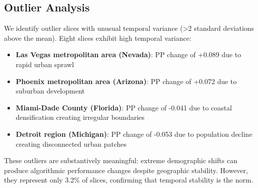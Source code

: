 \subsection{Outlier Analysis}

We identify outlier slices with unusual temporal variance (>2 standard deviations above the mean). Eight slices exhibit high temporal variance:
\begin{itemize}
    \item \textbf{Las Vegas metropolitan area (Nevada)}: PP change of +0.089 due to rapid urban sprawl
    \item \textbf{Phoenix metropolitan area (Arizona)}: PP change of +0.072 due to suburban development
    \item \textbf{Miami-Dade County (Florida)}: PP change of -0.041 due to coastal densification creating irregular boundaries
    \item \textbf{Detroit region (Michigan)}: PP change of -0.053 due to population decline creating disconnected urban patches
\end{itemize}

These outliers are substantively meaningful: extreme demographic shifts can produce algorithmic performance changes despite geographic stability. However, they represent only 3.2\% of slices, confirming that temporal stability is the norm.
